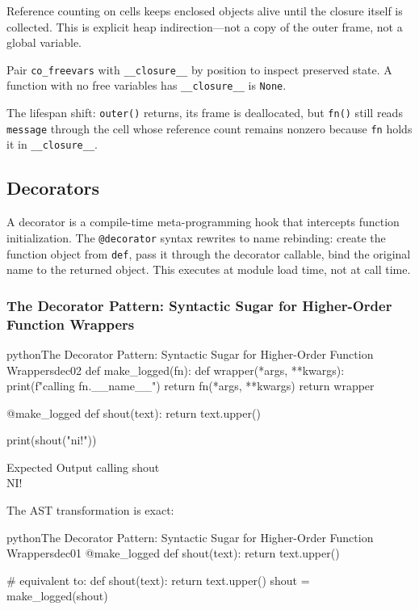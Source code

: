 \documentclass[a4paper,twoside]{report}
\begin{document}
Reference counting on cells keeps enclosed objects alive until the closure itself is collected. This is explicit heap indirection---not a copy of the outer frame, not a global variable.

Pair \texttt{co\_freevars} with \texttt{\_\_closure\_\_} by position to inspect preserved state. A function with no free variables has \texttt{\_\_closure\_\_} is \texttt{None}.

The lifespan shift: \texttt{outer()} returns, its frame is deallocated, but \texttt{fn()} still reads \texttt{message} through the cell whose reference count remains nonzero because \texttt{fn} holds it in \texttt{\_\_closure\_\_}.


\subsection{Decorators}

A decorator is a compile-time meta-programming hook that intercepts function initialization. The \texttt{@decorator} syntax rewrites to name rebinding: create the function object from \texttt{def}, pass it through the decorator callable, bind the original name to the returned object. This executes at module load time, not at call time.

\subsubsection{The Decorator Pattern: Syntactic Sugar for Higher-Order Function Wrappers}

\begin{codebox}[]{python}{The Decorator Pattern: Syntactic Sugar for Higher-Order Function Wrappers}{dec02}
def make_logged(fn):
    def wrapper(*args, **kwargs):
        print(f"calling {fn.__name__}")
        return fn(*args, **kwargs)
    return wrapper

@make_logged
def shout(text):
    return text.upper()

print(shout("ni!"))
\end{codebox}


\begin{iobox}{Expected Output}
calling shout \\
NI! \\
\end{iobox}




The AST transformation is exact:

\begin{codebox}[]{python}{The Decorator Pattern: Syntactic Sugar for Higher-Order Function Wrappers}{dec01}
@make_logged
def shout(text):
    return text.upper()

# equivalent to:
def shout(text):
    return text.upper()
shout = make_logged(shout)
\end{codebox}
\end{document}
